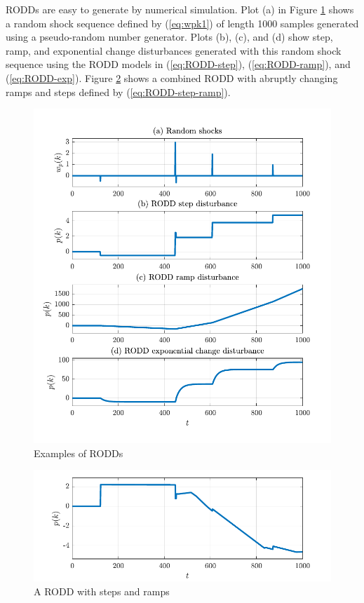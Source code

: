 \gls{RODD}s are easy to generate by numerical simulation.  Plot (a) in Figure \ref{fig:rodd-sim-plots} shows a random shock sequence defined by (\ref{eq:wpk1}) of length 1000 samples generated using a pseudo-random number generator. Plots (b), (c), and (d) show step, ramp, and exponential change disturbances generated with this random shock sequence using the \gls{RODD} models in (\ref{eq:RODD-step}), (\ref{eq:RODD-ramp}), and (\ref{eq:RODD-exp}). Figure \ref{fig:rodd-sim-plot2} shows a combined \gls{RODD} with abruptly changing ramps and steps defined by (\ref{eq:RODD-step-ramp}).
\begin{figure}[htp]
	\centering
	\includegraphics[width=13cm]{images/rodd_sim_plots.pdf}
	\caption{Examples of \gls{RODD}s}
	\label{fig:rodd-sim-plots}
\end{figure}
\begin{figure}[htp]
	\centering
	\includegraphics[width=13cm]{images/rodd_sim_plot2.pdf}
	\caption{A \gls{RODD} with steps and ramps}
	\label{fig:rodd-sim-plot2}
\end{figure}


